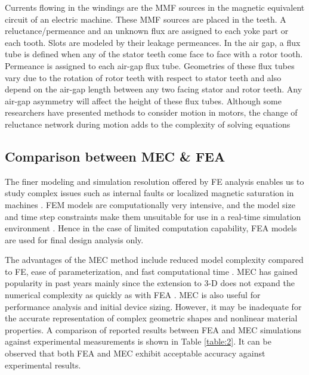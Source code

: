 Currents flowing in the windings are the MMF sources in the magnetic equivalent circuit of an electric machine. These MMF sources are placed in the teeth. A reluctance/permeance and an unknown flux are assigned to each yoke part or each tooth. Slots are modeled by their leakage permeances. In the air gap, a flux tube is defined when any of the stator teeth come face to face with a rotor tooth. Permeance is assigned to each air-gap flux tube. Geometries of these flux tubes vary due to the rotation of rotor teeth with respect to stator teeth and also depend on the air-gap length between any two facing stator and rotor teeth. Any air-gap asymmetry will affect the height of these flux tubes. Although some researchers have presented methods to consider motion in motors, the change of reluctance network during motion adds to the complexity of solving equations \parencite{zhao2011survey, zhang2006finite}

\subsection{Comparison between MEC \& FEA}

The finer modeling and simulation resolution offered by FE analysis enables us to study complex issues such as internal faults or localized magnetic saturation in machines \parencite{wang2007re}. FEM models are computationally very intensive, and the model size and time step constraints make them unsuitable for use in a real-time simulation environment \parencite{tavana2016real,liu2009equivalent}. Hence in the case of limited computation capability, FEA models are used for final design analysis only. 
 
The advantages of the MEC method include reduced model complexity compared to FE, ease of parameterization, and fast computational time \parencite{yilmaz2008capabilities}. MEC has gained popularity in past years mainly since the extension to 3-D does not expand the numerical complexity as quickly as with FEA \parencite{kim2002analysis,amrhein2007magnetic}. MEC is also useful for performance analysis and initial device sizing. However, it may be inadequate for the accurate representation of complex geometric shapes and nonlinear material properties. A comparison of reported results between FEA and MEC simulations against experimental measurements is shown in Table \ref{table:2}. It can be observed that both FEA and MEC exhibit acceptable accuracy against experimental results.

